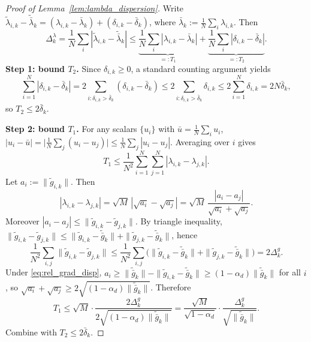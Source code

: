 \documentclass[review,onefignum,onetabnum]{siamart171218}
\begin{document}
\begin{proof}[Proof of Lemma~\ref{lem:lambda_dispersion}]
Write $\tilde\lambda_{i,k}-\tilde{\bar\lambda}_k=(\lambda_{i,k}-\bar\lambda_k)+(\delta_{i,k}-\bar\delta_k)$,
where $\bar\lambda_k:=\frac1N\sum_i\lambda_{i,k}$.
Then
\[
\Delta_k^\lambda
=\frac1N\sum_i|\tilde\lambda_{i,k}-\tilde{\bar\lambda}_k|
\le \underbrace{\frac1N\sum_i|\lambda_{i,k}-\bar\lambda_k|}_{=:T_1}
+\underbrace{\frac1N\sum_i|\delta_{i,k}-\bar\delta_k|}_{=:T_2}.
\]
\textbf{Step 1: bound $T_2$.}
Since $\delta_{i,k}\ge0$, a standard counting argument yields
\[
\sum_{i=1}^N|\delta_{i,k}-\bar\delta_k|
=2\sum_{i:\delta_{i,k}>\bar\delta_k}(\delta_{i,k}-\bar\delta_k)
\le 2\sum_{i:\delta_{i,k}>\bar\delta_k}\delta_{i,k}
\le 2\sum_{i=1}^N\delta_{i,k}=2N\bar\delta_k,
\]
so $T_2\le 2\bar\delta_k$.

\textbf{Step 2: bound $T_1$.}
For any scalars $\{u_i\}$ with $\bar u=\frac1N\sum_i u_i$,
$|u_i-\bar u|=\big|\frac1N\sum_j(u_i-u_j)\big|\le \frac1N\sum_j|u_i-u_j|$.
Averaging over $i$ gives
\[
T_1\le \frac{1}{N^2}\sum_{i=1}^N\sum_{j=1}^N|\lambda_{i,k}-\lambda_{j,k}|.
\]
Let $a_i:=\|\tilde g_{i,k}\|$. Then
\[
|\lambda_{i,k}-\lambda_{j,k}|
=\sqrt{M}\,|\sqrt{a_i}-\sqrt{a_j}|
=\sqrt{M}\,\frac{|a_i-a_j|}{\sqrt{a_i}+\sqrt{a_j}}.
\]
Moreover $|a_i-a_j|\le \|\tilde g_{i,k}-\tilde g_{j,k}\|$.
By triangle inequality,
$\|\tilde g_{i,k}-\tilde g_{j,k}\|\le \|\tilde g_{i,k}-\tilde{\bar g}_k\|+\|\tilde g_{j,k}-\tilde{\bar g}_k\|$,
hence
\[
\frac1{N^2}\sum_{i,j}\|\tilde g_{i,k}-\tilde g_{j,k}\|
\le \frac1{N^2}\sum_{i,j}\big(\|\tilde g_{i,k}-\tilde{\bar g}_k\|+\|\tilde g_{j,k}-\tilde{\bar g}_k\|\big)
=2\Delta_k^g.
\]
Under \eqref{eq:rel_grad_disp}, $a_i\ge \|\tilde{\bar g}_k\|-\|\tilde g_{i,k}-\tilde{\bar g}_k\|\ge (1-\alpha_d)\|\tilde{\bar g}_k\|$ for all $i$,
so $\sqrt{a_i}+\sqrt{a_j}\ge 2\sqrt{(1-\alpha_d)\|\tilde{\bar g}_k\|}$.
Therefore
\[
T_1\le \sqrt{M}\cdot \frac{2\Delta_k^g}{2\sqrt{(1-\alpha_d)\|\tilde{\bar g}_k\|}}
=\frac{\sqrt{M}}{\sqrt{1-\alpha_d}}\cdot \frac{\Delta_k^g}{\sqrt{\|\tilde{\bar g}_k\|}}.
\]
Combine with $T_2\le 2\bar\delta_k$.
\end{proof}
\end{document}
